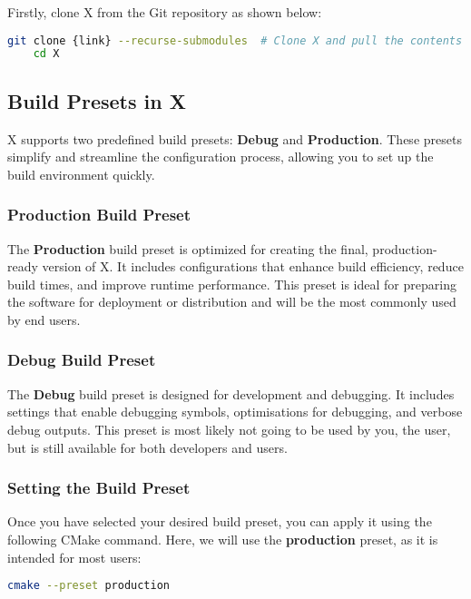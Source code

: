 \documentclass[a4paper,12pt]{article}
\begin{document}
Firstly, clone X from the Git repository as shown below:

\vspace{1em} 
\begin{lstlisting}[language=bash]   
    git clone {link} --recurse-submodules  # Clone X and pull the contents of its submodules 
    cd X
\end{lstlisting}
\vspace{1em} 

\subsection{Build Presets in X}

X supports two predefined build presets: \textbf{Debug} and \textbf{Production}. These presets simplify and streamline the configuration process, allowing you to set up the build environment quickly.

\subsubsection{Production Build Preset}
The \textbf{Production} build preset is optimized for creating the final, production-ready version of X. It includes configurations that enhance build efficiency, reduce build times, and improve runtime performance. This preset is ideal for preparing the software for deployment or distribution and will be the most commonly used by end users.

\subsubsection{Debug Build Preset}
The \textbf{Debug} build preset is designed for development and debugging. It includes settings that enable debugging symbols, optimisations for debugging, and verbose debug outputs. This preset is most likely not going to be used by you, the user, but is still available for both developers and users.

\subsubsection{Setting the Build Preset}
Once you have selected your desired build preset, you can apply it using the following CMake command. Here, we will use the \textbf{production} preset, as it is intended for most users:

\vspace{1em}
\begin{lstlisting}[language=bash]
    cmake --preset production
\end{lstlisting}
\vspace{1em}
\end{document}
